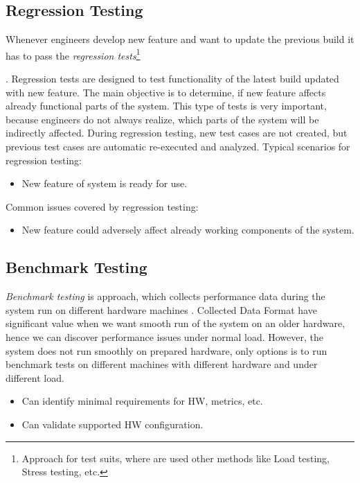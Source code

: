 \subsection*{Regression Testing}
Whenever engineers develop new feature and want to update the previous build it has to pass the \emph{regression tests}\footnote{Approach for test suits, where are used other methods like Load testing, Stress testing, etc.}\addtocounter{footnote}{-1}\addtocounter{Hfootnote}{-1} \cite{STF:REGRESSION}. Regression tests are designed to test functionality of the latest build updated with new feature. The main objective is to determine, if new feature affects already functional parts of the system. This type of tests is very important, because engineers do not always realize, which parts of the system will be indirectly affected. During regression testing, new test cases are not created, but previous test cases are automatic re-executed and analyzed. 
Typical scenarios for regression testing:
\begin{itemize}
	\setlength\itemsep{0em}
	\item New feature of system is ready for use.
\end{itemize}
Common issues covered by regression testing:
\begin{itemize}
	\setlength\itemsep{0em}
	\item New feature could adversely affect already working components of the system.
\end{itemize}


\subsection*{Benchmark Testing}
\emph{Benchmark testing}\footnotemark{} is approach, which collects performance data during the system run on different hardware machines \cite{Aho:Benchmarking}. Collected Data Format have significant value when we want smooth run of the system on an older hardware, hence we can discover performance issues under normal load. However, the system does not run smoothly on prepared hardware, only options is to run benchmark tests on different machines with different hardware and under different load.

\begin{itemize}
	\item Can identify minimal requirements for HW, metrics, etc.
	\item Can validate supported HW configuration.
\end{itemize}



